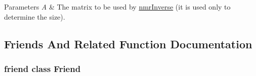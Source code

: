 \begin{DoxyParams}{Parameters}
{\em A} & The matrix to be used by \hyperlink{nmr_inverse_8h_a018d876444a46377abdd85e296643035}{nmr\-Inverse} (it is used only to determine the size). \\
\hline
\end{DoxyParams}


\subsection{Friends And Related Function Documentation}
\hypertarget{classnmr_inverse_dynamic_data_a7f8321d57e81bc613d5dbef3410ba70e}{
\subsubsection[{Friend}]{\setlength{\rightskip}{0pt plus 5cm}friend class {\bf Friend}\hspace{0.3cm}{\ttfamily [friend]}}}\label{classnmr_inverse_dynamic_data_a7f8321d57e81bc613d5dbef3410ba70e}


